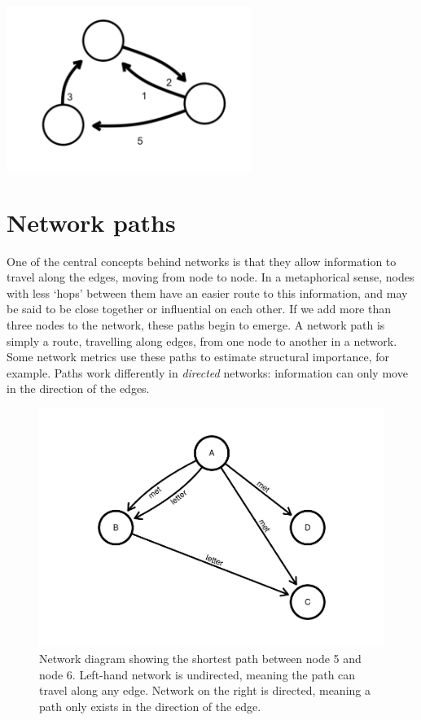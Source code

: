 \documentclass[
]{book}
\begin{document}
\includegraphics[width=3.125in,height=\textheight]{images/Screenshot 2022-09-26 at 11.31.15.png}

\hypertarget{network-paths}{%
\section{Network paths}\label{network-paths}}

One of the central concepts behind networks is that they allow information to travel along the edges, moving from node to node. In a metaphorical sense, nodes with less `hops' between them have an easier route to this information, and may be said to be close together or influential on each other. If we add more than three nodes to the network, these paths begin to emerge. A network path is simply a route, travelling along edges, from one node to another in a network. Some network metrics use these paths to estimate structural importance, for example. Paths work differently in \emph{directed} networks: information can only move in the direction of the edges.

\begin{figure}
\centering
\includegraphics{_main_files/figure-latex/unnamed-chunk-2-1.pdf}
\caption{\label{fig:unnamed-chunk-2}Network diagram showing the shortest path between node 5 and node 6. Left-hand network is undirected, meaning the path can travel along any edge. Network on the right is directed, meaning a path only exists in the direction of the edge.}
\end{figure}
\end{document}
